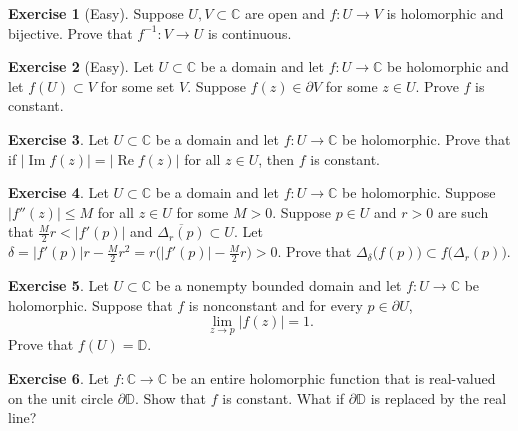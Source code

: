 \documentclass[12pt,openany]{book}
\renewcommand{\Re}{\operatorname{Re}}
\renewcommand{\Im}{\operatorname{Im}}
\newcommand{\sabs}[1]{\lvert {#1} \rvert}
\newcommand{\abs}[1]{\left\lvert {#1} \right\rvert}
\newcommand{\C}{{\mathbb{C}}}
\newcommand{\D}{{\mathbb{D}}}
\theoremstyle{plain}
\theoremstyle{remark}
\theoremstyle{definition}
\newenvironment{exbox}{%
    \def\FrameCommand{\vrule width 1pt \relax\hspace{10pt}}%
    \MakeFramed{\advance\hsize-\width\FrameRestore}%
}{%
    \endMakeFramed
}
\theoremstyle{exercise}
\newtheorem{exercise}{Exercise}[section]
\theoremstyle{example}
\begin{document}
\begin{exbox}
\begin{exercise}[Easy]
Suppose $U,V \subset \C$ are open and $f \colon U \to V$ is holomorphic
and bijective.  Prove that $f^{-1} \colon V \to U$ is continuous.
\end{exercise}

\begin{exercise}[Easy]
Let $U \subset \C$ be a domain and let $f \colon U \to \C$ be holomorphic
and let $f(U) \subset V$ for some set $V$.
Suppose $f(z) \in \partial V$
for some $z \in U$.  Prove $f$ is constant.
\end{exercise}

\begin{exercise}
Let $U \subset \C$ be a domain and let $f \colon U \to \C$ be holomorphic.
Prove that if $\abs{\Im f(z)} = \abs{\Re f(z)}$
for all $z \in U$,
then $f$ is constant.
\end{exercise}

\begin{exercise}
Let $U \subset \C$ be a domain and let $f \colon U \to \C$ be holomorphic.
Suppose $\sabs{f''(z)} \leq M$ for all $z \in U$ for some $M > 0$.
Suppose $p \in U$ and $r > 0$ are such that
$\frac{M}{2}r < \sabs{f'(p)}$ and $\overline{\Delta_r(p)} \subset U$.
Let $\delta = \sabs{f'(p)}r - \frac{M}{2} r^2
= r\bigl(\sabs{f'(p)} - \frac{M}{2} r\bigr) > 0$.  Prove that
$\Delta_{\delta}\bigl(f(p)\bigr) \subset f\bigl( \Delta_r(p) \bigr)$.
\end{exercise}

\begin{exercise}
Let $U \subset \C$ be a nonempty bounded domain and
let $f \colon U \to \C$ be holomorphic.
Suppose that $f$ is nonconstant and for every $p \in \partial U$,
\begin{equation*}
\lim_{z \to p} \abs{f(z)}=1 .
\end{equation*}
Prove that $f(U) = \D$.
\end{exercise}

\begin{exercise}
Let $f \colon \C \to \C$ be an entire holomorphic function 
that is real-valued on the unit circle $\partial \D$.  Show that $f$ is
constant.  What if $\partial \D$ is replaced by the real line?
\end{exercise}
\end{exbox}



\end{document}
